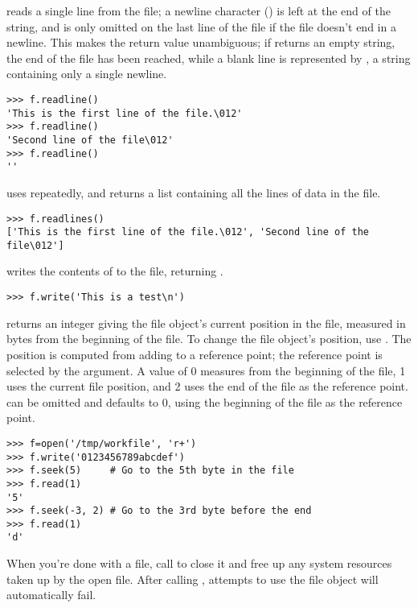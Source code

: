 \documentclass{manual}
\begin{document}
 reads a single line from the file; a newline
character () is left at the end of the string, and is only
omitted on the last line of the file if the file doesn't end in a
newline.  This makes the return value unambiguous; if
 returns an empty string, the end of the file has
been reached, while a blank line is represented by , a
string containing only a single newline.  

\begin{verbatim}
>>> f.readline()
'This is the first line of the file.\012'
>>> f.readline()
'Second line of the file\012'
>>> f.readline()
''
\end{verbatim}

 uses  repeatedly, and returns
a list containing all the lines of data in the file.

\begin{verbatim}
>>> f.readlines()
['This is the first line of the file.\012', 'Second line of the file\012']
\end{verbatim}

 writes the contents of  to
the file, returning .  

\begin{verbatim}
>>> f.write('This is a test\n')
\end{verbatim}

 returns an integer giving the file object's current
position in the file, measured in bytes from the beginning of the
file.  To change the file object's position, use
.  The position is
computed from adding  to a reference point; the reference
point is selected by the  argument.  A
 value of 0 measures from the beginning of the file, 1
uses the current file position, and 2 uses the end of the file as the
reference point.   can be omitted and defaults to 0,
using the beginning of the file as the reference point.

\begin{verbatim}
>>> f=open('/tmp/workfile', 'r+')
>>> f.write('0123456789abcdef')
>>> f.seek(5)     # Go to the 5th byte in the file
>>> f.read(1)        
'5'
>>> f.seek(-3, 2) # Go to the 3rd byte before the end
>>> f.read(1)
'd'
\end{verbatim}

When you're done with a file, call  to close it and
free up any system resources taken up by the open file.  After calling
, attempts to use the file object will automatically fail.
\end{document}

